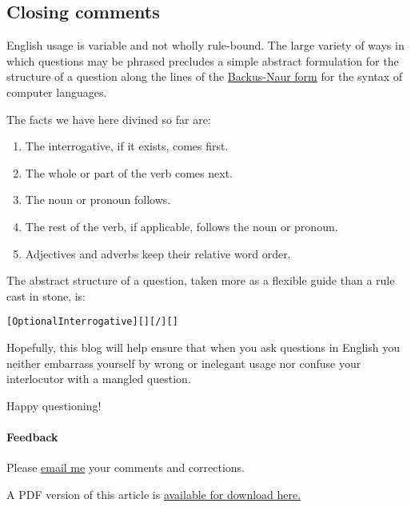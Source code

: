 \documentclass[
  11pt,
  british,
  a4paper,
]{article}
\begin{document}
\hypertarget{closing-comments}{%
\subsection{Closing comments}\label{closing-comments}}

English usage is variable and not wholly rule-bound. The large variety
of ways in which questions may be phrased precludes a simple abstract
formulation for the structure of a question along the lines of the
\href{http://en.wikipedia.org/wiki/Backus_Naur_form}{Backus-Naur form}
for the syntax of computer languages.

The facts we have here divined so far are:

\begin{enumerate}
\item
  The interrogative, if it exists, comes first.
\item
  The whole or part of the verb comes next.
\item
  The noun or pronoun follows.
\item
  The rest of the verb, if applicable, follows the noun or pronoun.
\item
  Adjectives and adverbs keep their relative word order.
\end{enumerate}

The abstract structure of a question, taken more as a flexible guide
than a rule cast in stone, is:

\begin{tcolorbox}
\begin{alltt}
\color{normal}
[Optional Interrogative] [] [/] []
\end{alltt}
\end{tcolorbox}

Hopefully, this blog will help ensure that when you ask questions in
English you neither embarrass yourself by wrong or inelegant usage nor
confuse your interlocutor with a mangled question.

Happy questioning!  \normalfont

\hypertarget{feedback}{%
\paragraph{Feedback}\label{feedback}}

Please \href{mailto:feedback.swanlotus@gmail.com}{email me} your
comments and corrections.

\noindent A PDF version of this article is
\href{./asking-questions-in-english.pdf}{available for download here.}
\end{document}
